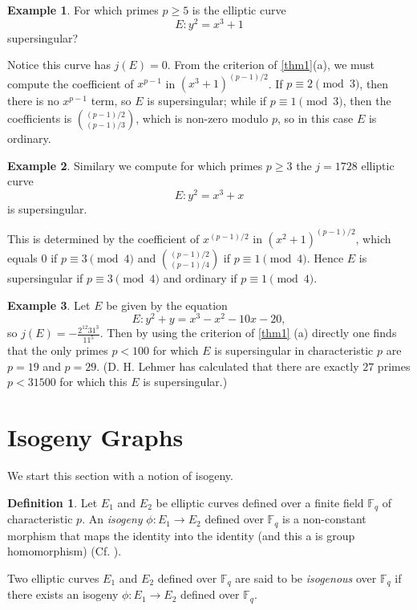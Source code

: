 \documentclass{article}
\theoremstyle{theorem}
\theoremstyle{definition}
\newtheorem{definition}{Definition}
\newtheorem{example}{Example}
\begin{document}
\begin{example}
	For which primes $p \geq 5$ is the elliptic curve
		\[E:  y^2 = x^3 + 1\]
	supersingular?
	
	Notice this curve has $j(E) = 0$. From the criterion of \cref{thm1}(a), we must compute the coefficient of $x^{p-1}$ in $(x^3 + 1)^{(p-1)/2}$. If $p \equiv 2 \pmod{3}$, then there is no $x^{p-1}$ term, so $E$ is supersingular; while if $p \equiv 1 \pmod{3}$, then the coefficients is $\binom{(p-1)/2}{(p-1)/3}$, which is non-zero modulo $p$, so in this case $E$ is ordinary.
\end{example}

\begin{example}
	Similary we compute for which primes $p \geq 3$ the $j = 1728$ elliptic curve
		\[E: y^2 = x^3 + x \]
	is supersingular.
	
	This is determined by the coefficient of $x^{(p-1)/2}$ in $(x^2 + 1)^{(p-1)/2}$, which equals $0$ if $p \equiv 3 \pmod{4}$ and $\binom{(p-1)/2}{(p-1)/4}$ if $p \equiv 1 \pmod{4}$. Hence $E$ is supersingular if $p \equiv 3 \pmod{4}$ and ordinary if $p \equiv 1 \pmod{4}$.
\end{example}

\begin{example}
	Let $E$ be given by the equation 
		\[E: y^2 + y = x^3 -x^2 -10x - 20,\]
	so $j(E) = -\frac{2^{12}31^3}{11^5}$. Then by using the criterion of \cref{thm1} (a) directly one finds that the only primes $p < 100$ for which $E$ is supersingular in characteristic $p$ are $p = 19$ and $p = 29$. (D. H. Lehmer has calculated that there are exactly $27$ primes $p < 31500$ for which this $E$ is supersingular.) 
\end{example}


\section{Isogeny Graphs}

We start this section with a notion of isogeny.
	\begin{definition} \label{isogeny}
		Let $E_1$ and $E_2$ be elliptic curves defined over a finite field $\mathbb{F}_q$ of characteristic $p$. An \textit{isogeny} $\phi: E_1 \to E_2$ defined over $\mathbb{F}_q$ is a non-constant morphism that maps the identity into the identity (and this a is group homomorphism) (Cf. \cite[2.1]{HardEasyProbs}).
	\end{definition}
Two elliptic curves $E_1$ and $E_2$ defined over $\mathbb{F}_q$ are said to be \textit{isogenous} over $\mathbb{F}_q$ if there exists an isogeny $\phi: E_1 \to E_2$ defined over $\mathbb{F}_q$.
\end{document}
